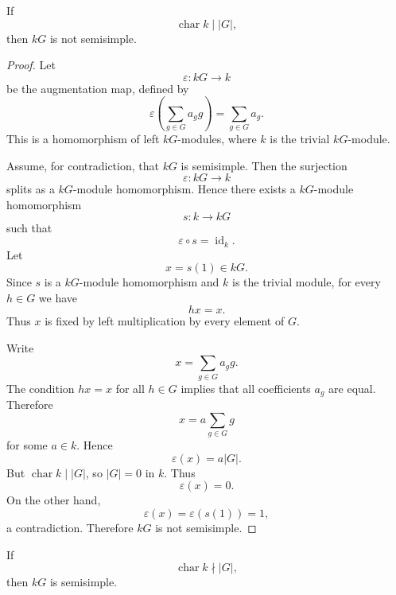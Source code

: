 \begin{theorem}
    If
    \[
        \operatorname{char} k \mid |G|,
    \]
    then \(kG\) is not semisimple.
\end{theorem}

\begin{proof}
    Let
    \[
        \varepsilon:kG\longrightarrow k
    \]
    be the augmentation map, defined by
    \[
        \varepsilon\left(\sum_{g\in G}a_g g\right)
        =
        \sum_{g\in G}a_g.
    \]
    This is a homomorphism of left \(kG\)-modules, where \(k\) is the trivial
    \(kG\)-module.

    Assume, for contradiction, that \(kG\) is semisimple. Then the surjection
    \[
        \varepsilon:kG\longrightarrow k
    \]
    splits as a \(kG\)-module homomorphism. Hence there exists a \(kG\)-module
    homomorphism
    \[
        s:k\longrightarrow kG
    \]
    such that
    \[
        \varepsilon\circ s=\operatorname{id}_k.
    \]
    Let
    \[
        x=s(1)\in kG.
    \]
    Since \(s\) is a \(kG\)-module homomorphism and \(k\) is the trivial module, for
    every \(h\in G\) we have
    \[
        hx=x.
    \]
    Thus \(x\) is fixed by left multiplication by every element of \(G\).

    Write
    \[
        x=\sum_{g\in G}a_g g.
    \]
    The condition \(hx=x\) for all \(h\in G\) implies that all coefficients
    \(a_g\) are equal. Therefore
    \[
        x=a\sum_{g\in G}g
    \]
    for some \(a\in k\). Hence
    \[
        \varepsilon(x)
        =
        a|G|.
    \]
    But \(\operatorname{char} k\mid |G|\), so \(|G|=0\) in \(k\). Thus
    \[
        \varepsilon(x)=0.
    \]
    On the other hand,
    \[
        \varepsilon(x)
        =
        \varepsilon(s(1))
        =
        1,
    \]
    a contradiction. Therefore \(kG\) is not semisimple.
\end{proof}

\begin{theorem}
    If
    \[
        \operatorname{char} k\nmid |G|,
    \]
    then \(kG\) is semisimple.
\end{theorem}


